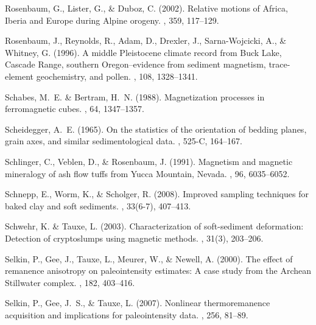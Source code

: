 Rosenbaum, G., Lister, G., \& Duboz, C. (2002).
\newblock Relative motions of Africa, Iberia and Europe during Alpine orogeny.
, 359, 117--129.

Rosenbaum, J., Reynolds, R., Adam, D., Drexler, J., Sarna-Wojcicki, A., \&
  Whitney, G. (1996).
\newblock A middle Pleistocene climate record from Buck Lake, Cascade Range,
  southern Oregon--evidence from sediment magnetism, trace-element
  geochemistry, and pollen.
, 108, 1328--1341.

Schabes, M.~E. \& Bertram, H.~N. (1988).
\newblock Magnetization processes in ferromagnetic cubes.
, 64, 1347--1357.

Scheidegger, A.~E. (1965).
\newblock On the statistics of the orientation of bedding planes, grain axes,
  and similar sedimentological data.
, 525-C, 164--167.

Schlinger, C., Veblen, D., \& Rosenbaum, J. (1991).
\newblock Magnetism and magnetic mineralogy of ash flow tuffs from Yucca
  Mountain, Nevada.
, 96, 6035--6052.

Schnepp, E., Worm, K., \& Scholger, R. (2008).
\newblock Improved sampling techniques for baked clay and soft sediments.
, 33(6-7), 407--413.

Schwehr, K. \& Tauxe, L. (2003).
\newblock Characterization of soft-sediment deformation: Detection of
  cryptoslumps using magnetic methods.
, 31(3), 203--206.

Selkin, P., Gee, J., Tauxe, L., Meurer, W., \& Newell, A. (2000).
\newblock The effect of remanence anisotropy on paleointensity estimates: A
  case study from the Archean Stillwater complex.
, 182, 403--416.

Selkin, P., Gee, J.~S., \& Tauxe, L. (2007).
\newblock Nonlinear thermoremanence acquisition and implications for
  paleointensity data.
, 256, 81--89.

